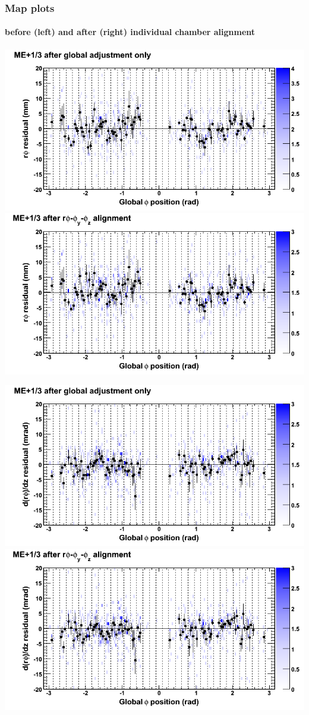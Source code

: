 \documentclass[compress]{beamer}
\begin{document}
\begin{frame}
\frametitle{Map plots}
\framesubtitle{before (left) and after (right) individual chamber alignment}
\includegraphics[width=0.5\linewidth]{ringmapplots_3dof/before_CSCvsphi_mep13_x.png} \includegraphics[width=0.5\linewidth]{ringmapplots_3dof/after_CSCvsphi_mep13_x.png}

\includegraphics[width=0.5\linewidth]{ringmapplots_3dof/before_CSCvsphi_mep13_dxdz.png} \includegraphics[width=0.5\linewidth]{ringmapplots_3dof/after_CSCvsphi_mep13_dxdz.png}
\end{frame}
\end{document}
